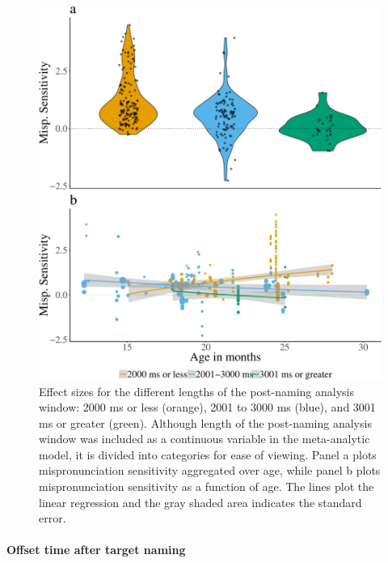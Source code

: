 \documentclass[man]{apa6}
\let\oldparagraph\paragraph
\renewcommand{\paragraph}[1]{\oldparagraph{#1}\mbox{}}
\theoremstyle{definition}
\theoremstyle{definition}
\theoremstyle{definition}
\theoremstyle{remark}
\begin{document}
\begin{figure}
\centering
\includegraphics{Paper_Analyses_files/figure-latex/Plot-post-name-cond-age-1.pdf}
\caption{\label{fig:Plot-post-name-cond-age}Effect sizes for the different
lengths of the post-naming analysis window: 2000 ms or less (orange),
2001 to 3000 ms (blue), and 3001 ms or greater (green). Although length
of the post-naming analysis window was included as a continuous variable
in the meta-analytic model, it is divided into categories for ease of
viewing. Panel a plots mispronunciation sensitivity aggregated over age,
while panel b plots mispronunciation sensitivity as a function of age.
The lines plot the linear regression and the gray shaded area indicates
the standard error.}
\end{figure}

\paragraph{Offset time after target
naming}\label{offset-time-after-target-naming}
\end{document}
